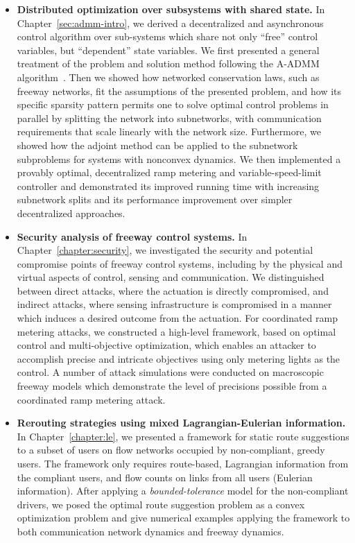 \begin{itemize}
	\item \textbf{Distributed optimization over subsystems with shared state.} In Chapter~\ref{sec:admm-intro}, we derived a decentralized and asynchronous control algorithm over sub-systems which share not only ``free'' control variables, but ``dependent'' state variables. We first presented a general treatment of the problem and solution method following the A-ADMM algorithm~\cite{Wei2013On}. Then we showed how networked conservation laws, such as freeway networks, fit the assumptions of the presented problem, and how its specific sparsity pattern permits one to solve optimal control problems in parallel by splitting the network into subnetworks, with communication requirements that scale linearly with the network size. Furthermore, we showed how the adjoint method can be applied to the subnetwork subproblems for systems with nonconvex dynamics. We then implemented a provably optimal, decentralized ramp metering and variable-speed-limit controller and demonstrated its improved running time with increasing subnetwork splits and its performance improvement over simpler decentralized approaches.
	\item \textbf{Security analysis of freeway control systems.} In Chapter~\ref{chapter:security}, we investigated the security and potential compromise points of freeway control systems, including by the physical and virtual aspects of control, sensing and communication. We distinguished between direct attacks, where the actuation is directly compromised, and indirect attacks, where sensing infrastructure is compromised in a manner which induces a desired outcome from the actuation. For coordinated ramp metering attacks, we constructed a high-level framework, based on optimal control and multi-objective optimization, which enables an attacker to accomplish precise and intricate objectives using only metering lights as the control. A number of attack simulations were conducted on macroscopic freeway models which demonstrate the level of precisions possible from a coordinated ramp metering attack.
	\item \textbf{Rerouting strategies using mixed Lagrangian-Eulerian information.} In Chapter~\ref{chapter:le}, we presented a framework for static route suggestions to a subset of users on flow networks occupied by non-compliant, greedy users. The framework only requires route-based, Lagrangian information from the compliant users, and flow counts on links from all users (Eulerian information). After applying a \emph{bounded-tolerance} model for the non-compliant drivers, we posed the optimal route suggestion problem as a convex optimization problem and give numerical examples applying the framework to both communication network dynamics and freeway dynamics.
\end{itemize}

